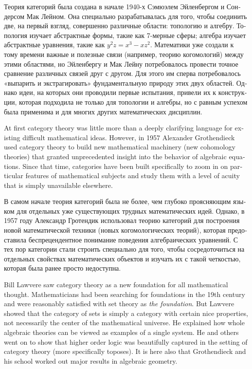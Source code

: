 \documentclass{book}
\theoremstyle{theoremENG}
\theoremstyle{lemmaENG}
\theoremstyle{propositionENG}
\theoremstyle{corollaryENG}
\theoremstyle{factENG}
\theoremstyle{remarkENG}
\theoremstyle{exampleENG}
\theoremstyle{warningENG}
\theoremstyle{questionENG}
\theoremstyle{guessENG}
\theoremstyle{answerENG}
\theoremstyle{constructionENG}
\theoremstyle{rulesENG}
\theoremstyle{excENG}
\theoremstyle{appENG}
\theoremstyle{definitionENG}
\theoremstyle{notationENG}
\theoremstyle{conjectureENG}
\theoremstyle{postulateENG}
\theoremstyle{theoremRUS}
\theoremstyle{lemmaRUS}
\theoremstyle{propositionRUS}
\theoremstyle{corollaryRUS}
\theoremstyle{factRUS}
\theoremstyle{remarkRUS}
\theoremstyle{exampleRUS}
\theoremstyle{warningRUS}
\theoremstyle{questionRUS}
\theoremstyle{guessRUS}
\theoremstyle{answerRUS}
\theoremstyle{constructionRUS}
\theoremstyle{rulesRUS}
\theoremstyle{excRUS}
\theoremstyle{appRUS}
\theoremstyle{definitionRUS}
\theoremstyle{notationRUS}
\theoremstyle{conjectureRUS}
\theoremstyle{postulateRUS}
\begin{document}
\begin{english}
\begin{russian}Теория категорий была создана в начале 1940-х Сэмюэлем Эйленбергом и Сондерсом Мак Лейном. Она специально разрабатывалась для того, чтобы соединить две, на первый взгляд, совершенно различные области: топологию и алгебру. Топология изучает абстрактные формы, такие как 7-мерные сферы; алгебра изучает абстрактные уравнения, такие как $y^2z=x^3-xz^2$. Математики уже создали к тому времени важные и полезные связи (например, теорию когомологий) между этими областями, но Эйленбергу и Мак Лейну потребовалось провести точное сравнение различных связей друг с другом. Для этого им сперва потребовалось «выпарить и экстрагировать» фундаментальную природу этих двух областей. Однако идеи, на которых они проводили первые испытания, привели их к конструкции, которая подходила не только для топологии и алгебры, но с равным успехом была применима и для многих других математических дисциплин. \end{russian}

At first category theory was little more than a deeply clarifying language for existing difficult mathematical ideas. However, in 1957 Alexander Grothendieck used category theory to build new mathematical machinery (new cohomology theories) that granted unprecedented insight into the behavior of algebraic equations. Since that time, categories have been built specifically to zoom in on particular features of mathematical subjects and study them with a level of acuity that is simply unavailable elsewhere.

\begin{russian}В самом начале теория категорий была не более, чем глубоко проясняющим языком для отдельных уже существующих трудных математических идей. Однако, в 1957 году Александр Гротендик использовал теорию категорий для построения новой математической техники (новых когомологических теорий), которая предоставила беспрецендентное понимание поведения алгебраических уравнений. С тех пор категории стали строить специально для того, чтобы сосредоточиться на отдельных свойствах математических объектов и изучать их с такой четкостью, которая была ранее просто недоступна. \end{russian}

Bill Lawvere saw category theory as a new foundation for all mathematical thought. Mathematicians had been searching for foundations in the 19th century and were reasonably satisfied with set theory as {\em the foundation}. But Lawvere showed that the category of sets is simply a category with certain nice properties, not necessarily the center of the mathematical universe. He explained how whole algebraic theories can be viewed as examples of a single system. He and others went on to show that higher order logic was beautifully captured in the setting of category theory (more specifically toposes). It is here also that Grothendieck and his school worked out major results in algebraic geometry.


\end{english}
\end{document}
